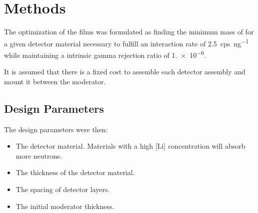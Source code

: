 \section{Methods}
\label{sec:Methodes}

The optimization of the films was formulated as finding the minimum mass of  for a given detector material necessary to fulfill an interaction rate of \SI{2.5}{cps\per\nano\gram{}} while maintaining a intrinsic gamma rejection ratio of \num{1.e-6}.

It is assumed that there is a fixed cost to assemble each detector assembly and mount it between the moderator.


\subsection{Design Parameters}
\label{sec:DesignParameters}
The design parameters were then:
\begin{itemize}
  \item The detector material. Materials with a high [Li] concentration will absorb more neutrons.
  \item The thickness of the detector material.
  \item The spacing of detector layers.
  \item The initial moderator thickness.
\end{itemize}

